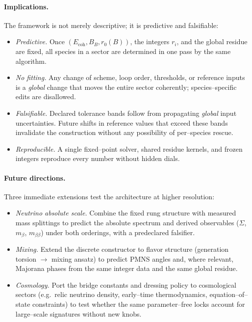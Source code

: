 \documentclass[epjc3]{svjour3}
\begin{document}
\paragraph{Implications.}
The framework is not merely descriptive; it is predictive and falsifiable:
\begin{itemize}
  \item \emph{Predictive.} Once $(E_{\mathrm{coh}},B_B,r_0(B))$, the integers $r_i$, and the global residue are fixed, all species in a sector are determined in one pass by the same algorithm.
  \item \emph{No fitting.} Any change of scheme, loop order, thresholds, or reference inputs is a \emph{global} change that moves the entire sector coherently; species–specific edits are disallowed.
  \item \emph{Falsifiable.} Declared tolerance bands follow from propagating \emph{global} input uncertainties. Future shifts in reference values that exceed these bands invalidate the construction without any possibility of per–species rescue.
  \item \emph{Reproducible.} A single fixed–point solver, shared residue kernels, and frozen integers reproduce every number without hidden dials.
\end{itemize}

\paragraph{Future directions.}
Three immediate extensions test the architecture at higher resolution:
\begin{itemize}
  \item \emph{Neutrino absolute scale.} Combine the fixed rung structure with measured mass splittings to predict the absolute spectrum and derived observables ($\Sigma$, $m_\beta$, $m_{\beta\beta}$) under both orderings, with a predeclared falsifier.
  \item \emph{Mixing.} Extend the discrete constructor to flavor structure (generation torsion $\to$ mixing ansatz) to predict PMNS angles and, where relevant, Majorana phases from the same integer data and the same global residue.
  \item \emph{Cosmology.} Port the bridge constants and dressing policy to cosmological sectors (e.g.\ relic neutrino density, early–time thermodynamics, equation–of–state constraints) to test whether the same parameter–free locks account for large–scale signatures without new knobs.
\end{itemize}
\end{document}
